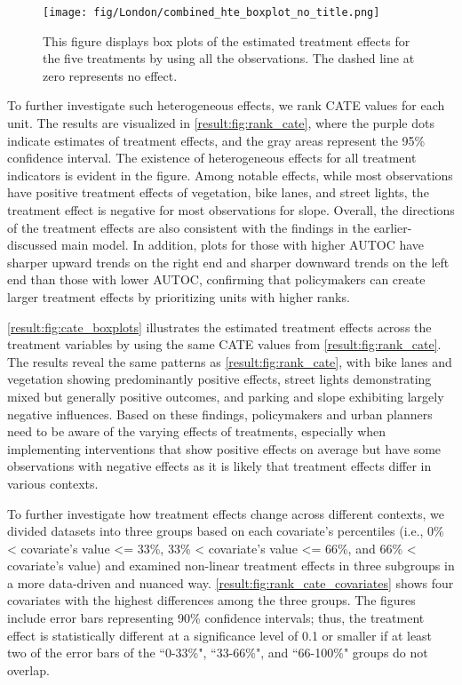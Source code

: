 \documentclass[preprint,12pt, authoryear]{elsarticle}
\begin{document}
\begin{figure}
    \centering
    \texttt{[image: fig/London/combined\_hte\_boxplot\_no\_title.png]}
    \caption{This figure displays box plots of the estimated treatment effects for the five treatments by using all the observations. The dashed line at zero represents no effect.}
    \label{result:fig:cate_boxplots}
\end{figure}


To further investigate such heterogeneous effects, we rank CATE values for each unit. The results are visualized in \autoref{result:fig:rank_cate}, where the purple dots indicate estimates of treatment effects, and the gray areas represent the 95\% confidence interval. The existence of heterogeneous effects for all treatment indicators is evident in the figure. Among notable effects, while most observations have positive treatment effects of vegetation, bike lanes, and street lights, the treatment effect is negative for most observations for slope. Overall, the directions of the treatment effects are also consistent with the findings in the earlier-discussed main model.
In addition, plots for those with higher AUTOC have sharper upward trends on the right end and sharper downward trends on the left end than those with lower AUTOC, confirming that policymakers can create larger treatment effects by prioritizing units with higher ranks. 

\autoref{result:fig:cate_boxplots} illustrates the estimated treatment effects across the treatment variables by using the same CATE values from \autoref{result:fig:rank_cate}. The results reveal the same patterns as \autoref{result:fig:rank_cate}, with bike lanes and vegetation showing predominantly positive effects, street lights demonstrating mixed but generally positive outcomes, and parking and slope exhibiting largely negative influences. Based on these findings, policymakers and urban planners need to be aware of the varying effects of treatments, especially when implementing interventions that show positive effects on average but have some observations with negative effects as it is likely that treatment effects differ in various contexts.

To further investigate how treatment effects change across different contexts, we divided datasets into three groups based on each covariate's percentiles (i.e., 0\% < covariate's value <= 33\%, 33\% < covariate's value <= 66\%, and 66\% < covariate's value) and examined non-linear treatment effects in three subgroups in a more data-driven and nuanced way.
\autoref{result:fig:rank_cate_covariates} shows four covariates with the highest differences among the three groups. The figures include error bars representing 90\% confidence intervals; thus, the treatment effect is statistically different at a significance level of 0.1 or smaller if at least two of the error bars of the ``0-33\%", ``33-66\%", and ``66-100\%" groups do not overlap. 
\end{document}

